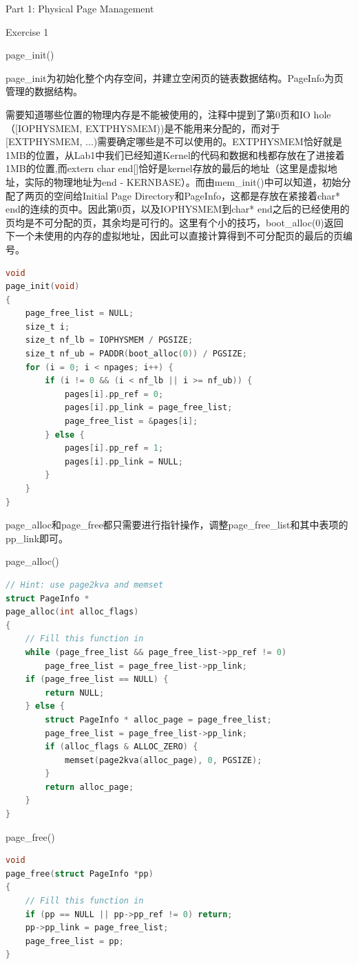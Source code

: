 \documentclass[GBK,winfonts,a4paper,10pt]{ctexart}
\begin{document}
\begin{section}{Part 1: Physical Page Management}
\begin{subsection}{Exercise 1}
\begin{subsubsection}{page\_init()}
\par
page\_init为初始化整个内存空间，并建立空闲页的链表数据结构。PageInfo为页管理的数据结构。
\par
需要知道哪些位置的物理内存是不能被使用的，注释中提到了第0页和IO hole（[IOPHYSMEM, EXTPHYSMEM))是不能用来分配的，而对于[EXTPHYSMEM, ...)需要确定哪些是不可以使用的。EXTPHYSMEM恰好就是1MB的位置，从Lab1中我们已经知道Kernel的代码和数据和栈都存放在了进接着1MB的位置,而extern char end[]恰好是kernel存放的最后的地址（这里是虚拟地址，实际的物理地址为end - KERNBASE）。而由mem\_init()中可以知道，初始分配了两页的空间给Initial Page Directory和PageInfo，这都是存放在紧接着char* end的连续的页中。因此第0页，以及IOPHYSMEM到char* end之后的已经使用的页均是不可分配的页，其余均是可行的。这里有个小的技巧，boot\_alloc(0)返回下一个未使用的内存的虚拟地址，因此可以直接计算得到不可分配页的最后的页编号。
\begin{lstlisting}[language=C]
void
page_init(void)
{
    page_free_list = NULL;
    size_t i;
	size_t nf_lb = IOPHYSMEM / PGSIZE;
    size_t nf_ub = PADDR(boot_alloc(0)) / PGSIZE;
    for (i = 0; i < npages; i++) {
        if (i != 0 && (i < nf_lb || i >= nf_ub)) {
		    pages[i].pp_ref = 0;
            pages[i].pp_link = page_free_list;
		    page_free_list = &pages[i];
        } else {
            pages[i].pp_ref = 1;
            pages[i].pp_link = NULL;
        }
	}
}
\end{lstlisting}
\end{subsubsection}

\par
page\_alloc和page\_free都只需要进行指针操作，调整page\_free\_list和其中表项的pp\_link即可。
\begin{subsubsection}{page\_alloc()}
\begin{lstlisting}[language=C]
// Hint: use page2kva and memset
struct PageInfo *
page_alloc(int alloc_flags)
{
	// Fill this function in
	while (page_free_list && page_free_list->pp_ref != 0) 
        page_free_list = page_free_list->pp_link;
	if (page_free_list == NULL) {
        return NULL;
    } else {
        struct PageInfo * alloc_page = page_free_list;
        page_free_list = page_free_list->pp_link;
        if (alloc_flags & ALLOC_ZERO) {
            memset(page2kva(alloc_page), 0, PGSIZE);
        }
        return alloc_page;
    }
}
\end{lstlisting}
\end{subsubsection}

\begin{subsubsection}{page\_free()}
\begin{lstlisting}[language=C]
void
page_free(struct PageInfo *pp)
{
	// Fill this function in
    if (pp == NULL || pp->pp_ref != 0) return;
    pp->pp_link = page_free_list;
    page_free_list = pp;
}
\end{lstlisting}
\end{subsubsection}

\end{subsection}

\end{section}
\end{document}
